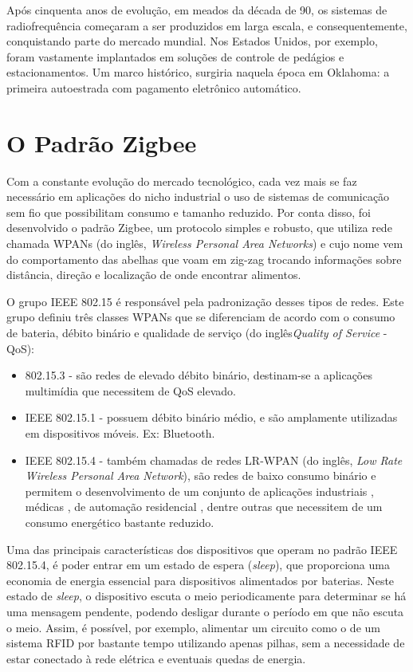\documentclass[tcc,capa]{texufpel}
\begin{document}
            Após cinquenta anos de evolução, em meados da década de 90, os sistemas de radiofrequência começaram a ser produzidos em larga escala, e consequentemente, conquistando parte do mercado mundial. Nos Estados Unidos, por exemplo, foram vastamente implantados em soluções de controle de pedágios e estacionamentos. Um marco histórico, surgiria naquela época em Oklahoma: a primeira autoestrada com pagamento eletrônico automático.
    
    
    \section{O Padrão Zigbee}
    
        Com a constante evolução do mercado tecnológico, cada vez mais se faz necessário em aplicações do nicho industrial o uso de sistemas de comunicação sem fio que possibilitam consumo e tamanho reduzido. Por conta disso, foi desenvolvido o padrão Zigbee, um protocolo simples e robusto, que utiliza rede chamada WPANs (do inglês, \textit{Wireless Personal Area Networks}) e cujo nome vem do comportamento das abelhas que voam em zig-zag trocando informações sobre distância, direção e localização de onde encontrar alimentos.
        
        O grupo IEEE 802.15 é responsável pela padronização desses tipos de redes. Este grupo definiu três classes WPANs que se diferenciam de acordo com o consumo de bateria, débito binário e qualidade de serviço (do inglês\textit{Quality of Service} - QoS):
    
        \begin{itemize}
            \item{802.15.3} - são redes de elevado débito binário, destinam-se a aplicações multimídia que necessitem de QoS elevado.
            \item{IEEE 802.15.1} - possuem débito binário médio, e são amplamente utilizadas em dispositivos móveis. Ex: Bluetooth.
            \item{IEEE 802.15.4} - também chamadas de redes LR-WPAN (do inglês, \textit{Low Rate Wireless Personal Area Network}), são redes de baixo consumo binário e permitem o desenvolvimento de um conjunto de aplicações industriais \cite{egan2005emergence}, médicas \cite{jacob2011smart}, de automação residencial \cite{gill2009zigbee}, dentre outras que necessitem de um consumo energético bastante reduzido.
        \end{itemize}
    
        Uma das principais características dos dispositivos que operam no padrão IEEE 802.15.4, é poder entrar em um estado de espera (\textit{sleep}), que proporciona uma economia de energia essencial para dispositivos alimentados por baterias. Neste estado de \textit{sleep}, o dispositivo
        escuta o meio periodicamente para determinar se há uma mensagem pendente, podendo desligar durante o período em que não escuta o meio. Assim, é possível, por exemplo, alimentar um circuito como o de um sistema RFID por bastante tempo utilizando apenas pilhas, sem a necessidade de estar conectado à rede elétrica e eventuais quedas de energia.
        
\end{document}
